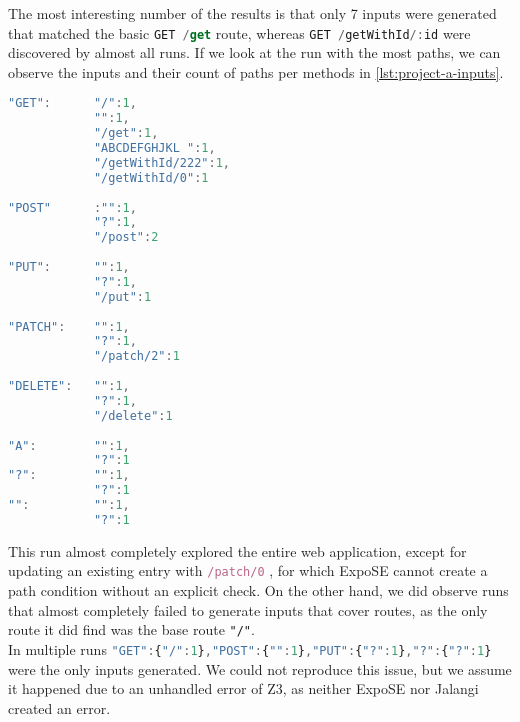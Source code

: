 The most interesting number of the results is that only 7 inputs were generated that matched the basic \lstinline[language=JavaScript]{GET /get} 
route, whereas \lstinline[language=JavaScript]{GET /getWithId/:id} were discovered by almost all runs.
If we look at the run with the most paths, we can observe the inputs and their count of paths per methods in \autoref{lst:project-a-inputs}.
\begin{lstlisting}[language=JavaScript, float, label={lst:project-a-inputs}, caption={[Generated Inputs for ExpressTest]The inputs generated for ExpressTest, listed by the HTTP method and their count.}]
"GET":      "/":1, 
            "":1, 
            "/get":1, 
            "ABCDEFGHJKL ":1,
            "/getWithId/222":1,
            "/getWithId/0":1
            
"POST"      :"":1,
            "?":1,
            "/post":2
            
"PUT":      "":1, 
            "?":1, 
            "/put":1
            
"PATCH":    "":1, 
            "?":1, 
            "/patch/2":1
            
"DELETE":   "":1, 
            "?":1, 
            "/delete":1
            
"A":        "":1,
            "?":1
"?":        "":1,
            "?":1
"":         "":1,
            "?":1
\end{lstlisting}
This run almost completely explored the entire web application, except for updating an existing entry with 
\lstinline[language=JavaScript]+/patch/0+
, for which ExpoSE cannot create a path condition without an explicit check. 
On the other hand, we did observe runs that almost completely failed to generate inputs that cover routes, as the only route it did find was the base route \lstinline+"/"+.\\
In multiple runs \lstinline[language=JavaScript]+"GET":{"/":1},"POST":{"":1},"PUT":{"?":1},"?":{"?":1}+ were the only inputs generated. 
We could not reproduce this issue, but we assume it happened due to an unhandled error of Z3, as neither ExpoSE nor Jalangi created an error. 


